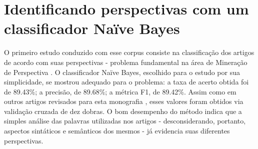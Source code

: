 













\section{Identificando perspectivas com um classificador Naïve Bayes}
\label{estudo:sec2}
O primeiro estudo conduzido com esse corpus consiste na classificação dos artigos de acordo com suas perspectivas - problema fundamental na área de Mineração de Perspectiva \cite{omsa}. O classificador Naïve Bayes, escolhido para o estudo por sua simplicidade, se mostrou adequado para o problema: a taxa de acerto obtida foi de 89.43\%; a precisão, de  89.68\%; a métrica F1, de 89.42\%. Assim como em outros artigos revisados para esta monografia \cite{lin-et-al2006} \cite{aaai-politics} \cite{klebanov}, esses valores foram obtidos via validação cruzada de dez dobras. O bom desempenho do método indica que a simples análise das palavras utilizadas nos artigos - desconsiderando, portanto, aspectos sintáticos e semânticos dos mesmos - já evidencia suas diferentes perspectivas. 

